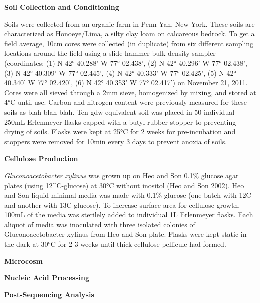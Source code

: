 \textbf{Soil Collection and Conditioning}



Soils were collected from an organic farm in Penn Yan, New York.  These soils are characterized as Honoeye/Lima, a silty clay loam on calcareous bedrock.  To get a field average, 10cm cores were collected (in duplicate) from six different sampling locations around the field using a slide hammer bulk density sampler (coordinates: (1) N 42° 40.288’ W 77° 02.438’, (2) N 42° 40.296’ W 77° 02.438’, (3) N 42° 40.309’ W 77° 02.445’, (4) N 42° 40.333’ W 77° 02.425’, (5) N 42° 40.340’ W 77° 02.420’, (6) N 42° 40.353’ W 77° 02.417’) on November 21, 2011.   Cores were all sieved through a 2mm sieve, homogenized by mixing, and stored at 4°C until use.  Carbon and nitrogen content were previously measured for these soils as blah blah blah.  Ten gdw equivalent soil was placed in 50 individual 250mL Erlenmeyer flasks capped with a butyl rubber stopper to preventing drying of soils.  Flasks were kept at 25°C for 2 weeks for pre-incubation and stoppers were removed for 10min every 3 days to prevent anoxia of soils.   



\textbf{Cellulose Production}



\textit{Gluconoacetobacter xylinus} was grown up on Heo and Son 0.1\% glucose agar plates (using 12^{C}-glucose) at 30°C without inositol (Heo and Son 2002).  Heo and Son liquid minimal media was made with 0.1\% glucose (one batch with 12C- and another with 13C-glucose).  To increase surface area for cellulose growth, 100mL of the media was sterilely added to individual 1L Erlenmeyer flasks.  Each aliquot of media was inoculated with three isolated colonies of Gluconoacetobacter xylinus from Heo and Son plate.  Flasks were kept static in the dark at 30°C for 2-3 weeks until thick cellulose pellicule had formed.  



\textbf{Microcosm}

\textbf{Nucleic Acid Processing}

\textbf{Post-Sequencing Analysis}